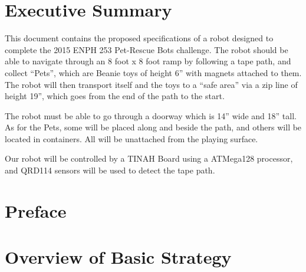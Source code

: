 \documentclass[11pt, oneside]{article} %
\begin{document}
\section*{Executive Summary}
This document contains the proposed specifications of a robot designed to complete the 2015 ENPH 253 Pet-Rescue Bots challenge. The robot should be able to navigate through an 8 foot x 8 foot ramp by following a tape path, and collect “Pets”, which are Beanie toys of height 6” with magnets attached to them. The robot will then transport itself and the toys to a “safe area” via a zip line of height 19”, which goes from the end of the path to the start.

The robot must be able to go through a doorway which is 14” wide and 18” tall. As for the Pets, some will be placed along and beside the path, and others will be located in containers. All will be unattached from the playing surface.

Our robot will be controlled by a TINAH Board using a ATMega128 processor, and QRD114 sensors will be used to detect the tape path.

\newpage


\tableofcontents %
\listoffigures %
\listoftables %


\newpage

\section{Preface}

\section{Overview of Basic Strategy}
\end{document}
